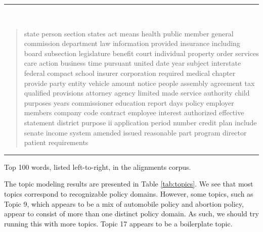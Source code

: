 \documentclass[12pt]{article} %
\begin{document}
\begin{table}[ht]
\rule{\textwidth}{1pt} \\ \vspace{-1cm}
\begin{quotation}
\noindent state person section states act means health public member general commission department law information provided insurance including board subsection legislature benefit court individual property order services care action business time pursuant united date year subject interstate federal compact school insurer corporation required medical chapter provide party entity vehicle amount notice people assembly agreement tax qualified provisions attorney agency limited made service authority child purposes years commissioner education report days policy employer members company code contract employee interest authorized effective statement district purpose ii application period number credit plan include senate income system amended issued reasonable part program director patient requirements
\end{quotation} \vspace{-.5cm}
\rule{\textwidth}{1pt} \vspace{-.2cm}
\caption{Top 100 words, listed left-to-right, in the alignments corpus.}
\label{tab:top100words}
\end{table}

The topic modeling results are presented in Table \ref{tab:topics}. We see that most topics correspond to recognizable policy domains. However, some topics, such as Topic 9, which appears to be a mix of automobile policy and abortion policy, appear to consist of more than one distinct policy domain. As such, we should try running this with more topics. Topic 17 appears to be a boilerplate topic. 
\end{document}
